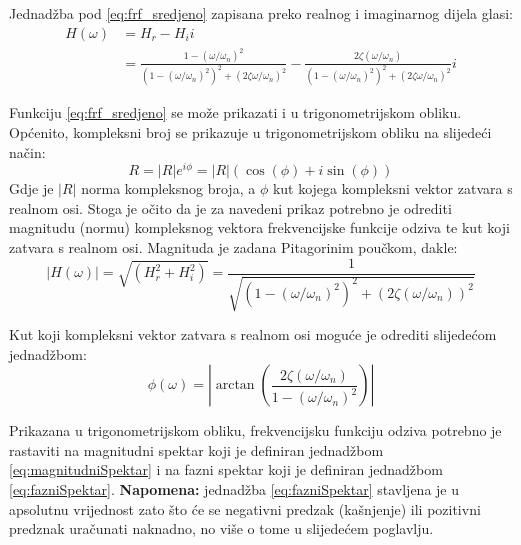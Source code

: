 Jednadžba pod \eqref{eq:frf_sredjeno} zapisana preko realnog i imaginarnog dijela
glasi:
\begin{equation}\label{eq:frf_pravokutni}
    \begin{split}
        H(\omega) &= H_r - H_ii  \\
              &= \frac{1-(\omega/\omega_n)^2}{(1-(\omega/\omega_n)^2)^2+(2\zeta\omega/\omega_n)^2}
              -\frac{2\zeta(\omega/\omega_n)}{(1-(\omega/\omega_n)^2)^2+(2\zeta\omega/\omega_n)^2}i
    \end{split}
\end{equation}

Funkciju \eqref{eq:frf_sredjeno} se može prikazati i u trigonometrijskom obliku.
Općenito, kompleksni broj se prikazuje u trigonometrijskom obliku na slijedeći
način:
\begin{equation}\label{eq:trig_zapis_kompleksni_br}
    R=|R|e^{i\phi} = |R|(\cos(\phi)+i\sin(\phi))
\end{equation}
Gdje je $|R|$ norma kompleksnog broja, a $\phi$ kut kojega kompleksni vektor zatvara
s realnom osi.
Stoga je očito da je za navedeni prikaz potrebno je odrediti magnitudu (normu) kompleksnog
vektora frekvencijske funkcije odziva te kut koji zatvara s realnom osi. Magnituda je 
zadana Pitagorinim poučkom, dakle:
\begin{equation}\label{eq:magnitudniSpektar}
    |H(\omega)|=\sqrt{(H_r^2+H_i^2)}
               =\frac{1}{\sqrt{(1-(\omega/\omega_n)^2)^2+(2\zeta(\omega/\omega_n))^2}}
\end{equation}

Kut koji kompleksni vektor zatvara s realnom osi moguće je odrediti slijedećom
jednadžbom:
\begin{equation}
        \phi(\omega)=\left|\arctan\left(\frac{2\zeta(\omega/\omega_n)}
                      {1-(\omega/\omega_n)^2}\right)\right|\label{eq:fazniSpektar}
\end{equation}

Prikazana u trigonometrijskom obliku, frekvencijsku funkciju odziva potrebno je
rastaviti na magnitudni spektar koji je definiran jednadžbom \eqref{eq:magnitudniSpektar} i
na fazni spektar koji je definiran jednadžbom \eqref{eq:fazniSpektar}.
\textbf{Napomena:} jednadžba \eqref{eq:fazniSpektar} stavljena je u apsolutnu
vrijednost zato što će se negativni predzak (kašnjenje) ili pozitivni predznak
uračunati naknadno, no više o tome u slijedećem poglavlju.
